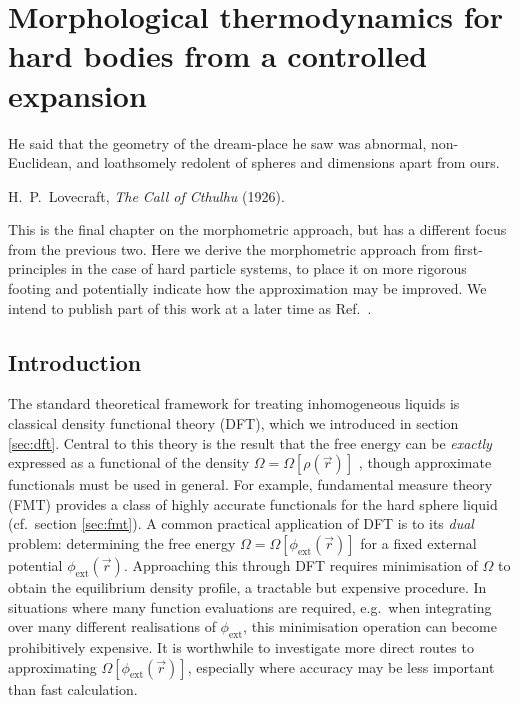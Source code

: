 \documentclass[11pt,twoside]{report}
\begin{document}
\chapter{Morphological thermodynamics for hard bodies from a controlled expansion}
\epigraph{He said that the geometry of the dream-place he saw was abnormal, non-Euclidean, and loathsomely redolent of spheres and dimensions apart from ours.}{H.\ P.\ Lovecraft, \emph{The Call of Cthulhu} (1926).}
\label{chapter:resummation}

This is the final chapter on the morphometric approach, but has a different focus from the previous two.
Here we derive the morphometric approach from first-principles in the case of hard particle systems, to place it on more rigorous footing and potentially indicate how the approximation may be improved.
We intend to publish part of this work at a later time as Ref.\ \cite{RobinsonResummation2019}.

\section{Introduction}

The standard theoretical framework for treating inhomogeneous liquids is classical density functional theory (DFT), which we introduced in section \ref{sec:dft}.
Central to this theory is the result that the free energy can be \emph{exactly} expressed as a functional of the density $\Omega = \Omega[\rho(\vec{r})]$ \cite{EvansAP1979}, though approximate functionals must be used in general.
For example, fundamental measure theory (FMT) \cite{RosenfeldPRL1989} provides a class of highly accurate functionals for the hard sphere liquid (cf.\ section \ref{sec:fmt}).
A common practical application of DFT is to its \emph{dual} problem: determining the free energy $\Omega = \Omega[\phi_\mathrm{ext}(\vec{r})]$ for a fixed external potential $\phi_\mathrm{ext}(\vec{r})$.
Approaching this through DFT requires minimisation of $\Omega$ to obtain the equilibrium density profile, a tractable but expensive procedure.
In situations where many function evaluations are required, e.g.\ when integrating over many different realisations of $\phi_\mathrm{ext}$, this minimisation operation can become prohibitively expensive.
It is worthwhile to investigate more direct routes to approximating $\Omega[\phi_\mathrm{ext}(\vec{r})]$, especially where accuracy may be less important than fast calculation.
\end{document}

